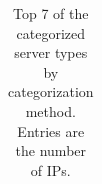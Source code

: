 \begin{table}[tb!]
\begin{tabular}{@{}l r r r r@{}}
\bottomrule
\end{tabular}
\caption{Top 7 of the categorized server types by categorization method. Entries are the number of IPs.}
\label{tab:CatResults_full}
\end{table}